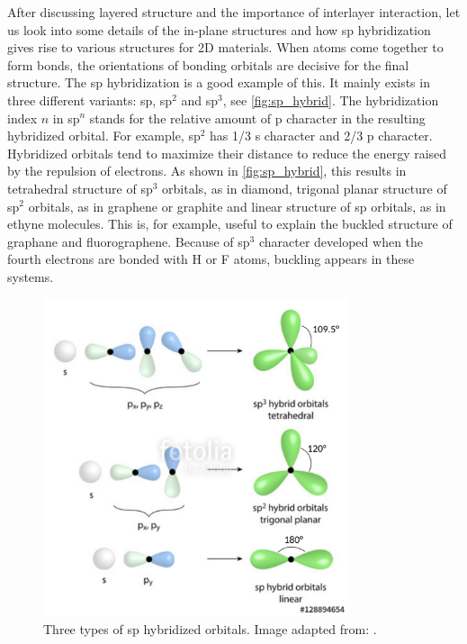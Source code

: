 After discussing layered structure and the importance of interlayer interaction, let us look into some details of the in-plane structures and how sp hybridization gives rise to various structures for 2D materials. When atoms come together to form bonds, the orientations of bonding orbitals are decisive for the final structure. The sp hybridization is a good example of this.  It mainly exists in three different variants: sp, sp$^2$ and sp$^3$, see \autoref{fig:sp_hybrid}. The hybridization index $n$ in sp$^n$ stands for the relative amount of p character in the resulting hybridized orbital. For example, sp$^2$ has 1/3 s character and 2/3 p character. Hybridized orbitals tend to maximize their distance to reduce the energy raised by the repulsion of electrons. As shown in \autoref{fig:sp_hybrid}, this results in tetrahedral structure of sp$^3$ orbitals, as in diamond, trigonal planar structure of sp$^2$ orbitals, as in graphene or graphite and linear structure of sp orbitals, as in ethyne molecules.  This is, for example, useful to explain the buckled structure of graphane and fluorographene. Because of sp$^3$ character developed when the fourth electrons are bonded with H or F atoms, buckling appears in these systems. 

\begin{figure}[htbp!] 
\centering  
\includegraphics[width=0.8\textwidth]{sp_hybrid.png}
\caption{Three types of sp hybridized orbitals. Image adapted from: \cite{sp_hybrid}. }  
\label{fig:sp_hybrid}
\end{figure} 

